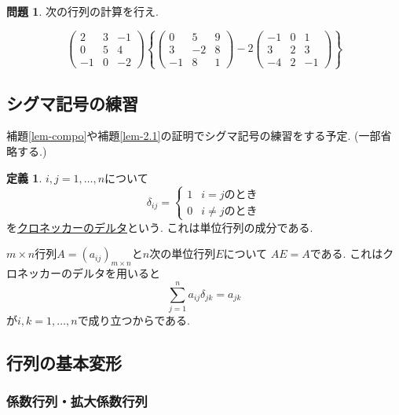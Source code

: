 \documentclass[dvipdfmx,a4paper,11pt]{article}
\theoremstyle{definition}
\newtheorem{dfn}[thm]{定義}
\newtheorem{ques}[thm]{問題}
\begin{document}
 
  \begin{ques}
 次の行列の計算を行え.

 $$
 \begin{pmatrix}
 2 &3&-1 \\
 0&5&4\\
 -1&0&-2
 \end{pmatrix}
 \left\{
 \begin{pmatrix}
 0 &5&9 \\
 3&-2&8\\
 -1&8&1
 \end{pmatrix}
 - 2
  \begin{pmatrix}
 -1 &0&1 \\
 3&2&3\\
 -4&2&-1
 \end{pmatrix}
\right\}
 $$
  \end{ques}


 

\subsection{シグマ記号の練習\cite[2.3節]{M}}
補題\ref{lem-compo}や補題\ref{lem-2.1}の証明でシグマ記号の練習をする予定. (一部省略する.)

\begin{tcolorbox}[
    colback = white,
    colframe = green!35!black,
    fonttitle = \bfseries,
    breakable = true]
    \begin{dfn}
    $ i,j =1, \ldots, n$について
 $$
 \delta_{ij} = 
 \begin{cases}
1 & \text{$i=j$のとき}\\
0 & \text{$i \neq j$のとき}
\end{cases}
  $$
を\underline{クロネッカーのデルタ}という.
これは単位行列の成分である. 
 \end{dfn}
 \end{tcolorbox}
 $m \times n$行列$A =(a_{ij})_{m \times n}$と$n$次の単位行列$E$について
 $AE=A$である.
 これはクロネッカーのデルタを用いると
 $$
 \sum_{j=1}^{n}a_{ij}\delta_{jk}
 =
 a_{jk}
 $$
 が$i,k=1, \ldots, n$で成り立つからである.
  
\subsection{行列の基本変形 \cite[2.4節]{M}}

\subsubsection{係数行列・拡大係数行列}
\end{document}
